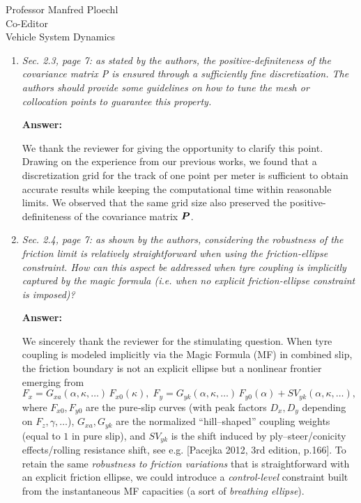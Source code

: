 \documentclass{letter}
\begin{document}
\begin{letter}{Professor Manfred Ploechl\\
Co-Editor\\
Vehicle System Dynamics}
\begin{enumerate}
\hrulefill

\item
\textit{Sec. 2.3, page 7: as stated by the authors, the positive-definiteness of the covariance matrix P is ensured through a sufficiently fine discretization. The authors should provide some guidelines on how to tune the mesh or collocation points to guarantee this property.
}

\vspace{2mm}

\textbf{Answer:}

We thank the reviewer for giving the opportunity to clarify this point. Drawing on the experience from our previous works, we found that a discretization grid for the track of one point per meter is sufficient to obtain accurate results while keeping the computational time within reasonable limits. We observed that the same grid size also preserved the positive-definiteness of the covariance matrix $\boldsymbol{P}$.

\hrulefill

\item
\textit{Sec. 2.4, page 7: as shown by the authors, considering the robustness of the friction limit is relatively straightforward when using the friction-ellipse constraint. How can this aspect be addressed when tyre coupling is implicitly captured by the magic formula (i.e. when no explicit friction-ellipse constraint is imposed)?}

\vspace{2mm}

\textbf{Answer:}

We sincerely thank the reviewer for the stimulating question. When tyre coupling is modeled implicitly via the Magic Formula (MF) in combined slip, the friction boundary is not an explicit ellipse but a nonlinear frontier emerging from
\begin{equation}
F_x = G_{xa}(\alpha,\kappa,\ldots)\,F_{x0}(\kappa),
\;
F_y = G_{yk}(\alpha,\kappa,\ldots)\,F_{y0}(\alpha) + SV_{yk}(\alpha,\kappa,\ldots),
\label{eq:MF-combined}
\end{equation}
where $F_{x0},F_{y0}$ are the pure‐slip curves (with peak factors $D_x,D_y$ depending on $F_z,\gamma,\ldots$), $G_{xa},G_{yk}$ are the normalized “hill–shaped” coupling weights (equal to $1$ in pure slip), and $SV_{yk}$ is the shift induced by ply–steer/conicity effects/rolling resistance shift, see e.g. [Pacejka 2012, 3rd edition, p.166].
To retain the same \emph{robustness to friction variations} that is straightforward with an explicit friction ellipse, we could introduce a \emph{control-level} constraint built from the instantaneous MF capacities (a sort of \emph{breathing ellipse}).


\end{enumerate}
\end{letter}
\end{document}
